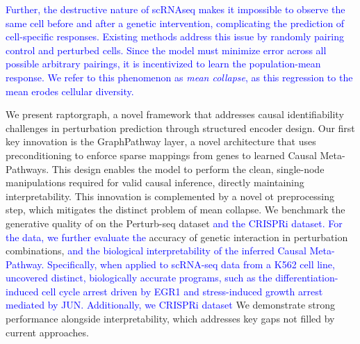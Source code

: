 \textcolor{blue}{Further, the destructive nature of \gls{scRNAseq} makes it impossible to observe the same cell before and after a genetic intervention, complicating the prediction of cell-specific responses.
Existing methods address this issue by randomly pairing control and perturbed cells.
Since the model must minimize error across all possible arbitrary pairings, it is incentivized to learn the population-mean response.
We refer to this phenomenon as \emph{mean collapse}, as this regression to the mean erodes cellular diversity.}

We present \gls{raptorgraph}, a novel framework that addresses causal identifiability challenges in perturbation prediction through structured encoder design. 
Our first key innovation is the GraphPathway layer, a novel architecture that uses preconditioning to enforce sparse mappings from genes to learned Causal Meta-Pathways. 
This design enables the model to perform the clean, single-node manipulations required for valid causal inference, directly maintaining interpretability.
This innovation is complemented by a novel \gls{ot} preprocessing step, which mitigates the distinct problem of mean collapse.
We benchmark the generative quality of  on the \citet{norman2019exploring} Perturb-seq dataset \textcolor{blue}{and the \citet{replogle_combinatorial_2020} CRISPRi dataset.
For the \citet{norman2019exploring} data, we further evaluate the} accuracy of genetic interaction in perturbation combinations, \textcolor{blue}{and the biological interpretability of the inferred Causal Meta-Pathway.
Specifically, when applied to scRNA-seq data from a K562 cell line,  uncovered distinct, biologically accurate programs, such as the differentiation-induced cell cycle arrest driven by EGR1 and stress-induced growth arrest mediated by JUN.}
\textcolor{blue}{Additionally, we \citet{replogle_combinatorial_2020} CRISPRi dataset}
We demonstrate strong performance alongside interpretability, which addresses key gaps not filled by current approaches.

